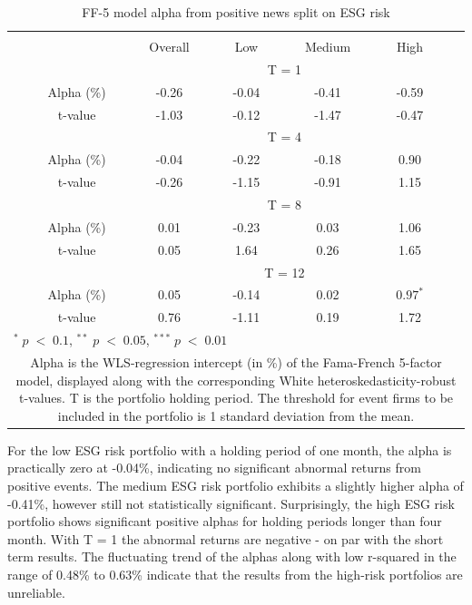 \setlength{\tabcolsep}{15pt}
\begin{table}[H]
\small
\centering
\caption{FF-5 model alpha from positive news split on ESG risk} 
\begin{tabular}{ccccccc}
\hline \hline \\  
 &     & Overall  &    Low  &  Medium  &  High  &  \\ \cline{3-6} 
& & \multicolumn{4}{c}{ T = 1} & \\ \cline{2-6}
& Alpha (\%)  & -0.26 & -0.04  & -0.41  & -0.59 &  \\
& t-value & -1.03 & -0.12 & -1.47  & -0.47 & \\
& &  \multicolumn{4}{c}{ T = 4} & \\ \cline{2-6}
& Alpha (\%)  & -0.04 & -0.22  & -0.18  &  0.90 & \\
& t-value & -0.26 & -1.15 & -0.91  & 1.15 & \\
& &  \multicolumn{4}{c}{ T = 8} & \\ \cline{2-6}
& Alpha (\%)  & 0.01 & -0.23   & 0.03  & 1.06 &  \\
& t-value & 0.05 & 1.64  & 0.26 & 1.65 & \\
&  &  \multicolumn{4}{c}{ T = 12} & \\ \cline{2-6}
& Alpha (\%)  & 0.05 & -0.14  & 0.02  & $0.97^{*}$ &  \\
& t-value & 0.76 & -1.11  & 0.19 & 1.72 & \\
\hline \hline
 \multicolumn{7}{l}{ \footnotesize $^* \; p\; <\; 0.1$, $ ^{**} \; p\; <\; 0.05$, $ ^{***} \; p\; <\; 0.01$  } \\
 \multicolumn{7}{p{12cm}}{ \footnotesize Alpha is the WLS-regression intercept (in \%) of the Fama-French 5-factor model, displayed along with the corresponding White heteroskedasticity-robust t-values. T is the portfolio holding period. The threshold for event firms to be included in the portfolio is 1 standard deviation from the mean.}  \\ 
\end{tabular}
\label{tab: FF5_pos_ESG}
\end{table}

For the low ESG risk portfolio with a holding period of one month, the alpha is practically zero at -0.04\%, indicating no significant abnormal returns from positive events. The medium ESG risk portfolio exhibits a slightly higher alpha of -0.41\%, however still not statistically significant. Surprisingly, the high ESG risk portfolio shows significant positive alphas for holding periods longer than four month. With T = 1 the abnormal returns are negative - on par with the short term results. The fluctuating trend of the alphas along with low r-squared in the range of 0.48\% to 0.63\% indicate that the results from the high-risk portfolios are unreliable. 

